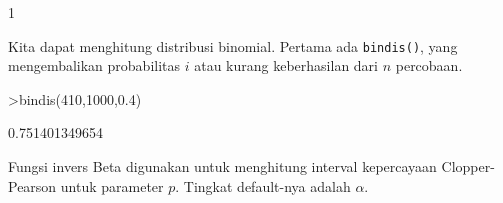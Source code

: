\documentclass[a4paper,11pt,oneside,enabledeprecatedfontcommands]{scrbook}
\newenvironment{eulernotebook}{}{}
\newenvironment{eulercomment}{\par\medskip\noindent}{\par\medskip}
\begin{document}
\begin{eulernotebook}
\begin{euleroutput}
			1
		\end{euleroutput}
		\begin{eulercomment}
			Kita dapat menghitung distribusi binomial. Pertama ada \texttt{bindis()}, yang mengembalikan probabilitas
			$i$ atau kurang keberhasilan dari $n$ percobaan.
		\end{eulercomment}
		\begin{eulerprompt}
			>bindis(410,1000,0.4)
		\end{eulerprompt}
		\begin{euleroutput}
			0.751401349654
		\end{euleroutput}
		\begin{eulercomment}
			Fungsi invers Beta digunakan untuk menghitung interval kepercayaan Clopper-Pearson untuk parameter $p$.
			Tingkat default-nya adalah $\alpha$.
			

\end{eulercomment}
\end{eulernotebook}
\end{document}
